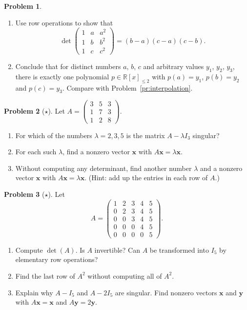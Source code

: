 \documentclass[11pt]{article}
\theoremstyle{definition}
\newtheorem{problem}{Problem}[section]
\begin{document}
\begin{problem}\label{pr:vandermonde}
    \begin{enumerate}[label=(\alph*)]
        \item Use row operations to show that
        \[\det \begin{pmatrix} 1 & a & a^2 \\ 1 & b & b^2 \\ 1 & c & c^2 \end{pmatrix} = (b - a)(c - a)(c - b).\]
        \item Conclude that for distinct numbers $a$, $b$, $c$ and arbitrary values $y_1$, $y_2$, $y_3$, there is exactly one polynomial $p \in \mathbb{R}[x]_{\leq 2}$ with $p(a) = y_1$, $p(b) = y_2$ and $p(c) = y_3$. Compare with Problem~\ref{pr:interpolation}.
    \end{enumerate}
\end{problem}

\begin{problem}[$\star$]\label{pr:lambda}
    Let $A = \begin{pmatrix} 3 & 5 & 3 \\ 1 & 7 & 3 \\ 1 & 2 & 8 \end{pmatrix}$.
    \begin{enumerate}[label=(\alph*)]
        \item For which of the numbers $\lambda = 2, 3, 5$ is the matrix $A - \lambda I_3$ singular?
        \item For each such $\lambda$, find a nonzero vector $\mathbf{x}$ with $A\mathbf{x} = \lambda \mathbf{x}$.
        \item Without computing any determinant, find another number $\lambda$ and a nonzero vector $\mathbf{x}$ with $A\mathbf{x} = \lambda \mathbf{x}$. (Hint: add up the entries in each row of $A$.)
    \end{enumerate}
\end{problem}

\begin{problem}[$\star$]\label{pr:upper5}
    Let
    \[A = \begin{pmatrix} 1 & 2 & 3 & 4 & 5 \\ 0 & 2 & 3 & 4 & 5 \\ 0 & 0 & 3 & 4 & 5 \\ 0 & 0 & 0 & 4 & 5 \\ 0 & 0 & 0 & 0 & 5 \end{pmatrix}.\]
    \begin{enumerate}[label=(\alph*)]
        \item Compute $\det(A)$. Is $A$ invertible? Can $A$ be transformed into $I_5$ by elementary row operations?
        \item Find the last row of $A^2$ without computing all of $A^2$.
        \item Explain why $A - I_5$ and $A - 2I_5$ are singular. Find nonzero vectors $\mathbf{x}$ and $\mathbf{y}$ with $A\mathbf{x} = \mathbf{x}$ and $A\mathbf{y} = 2\mathbf{y}$.
    \end{enumerate}
\end{problem}
\end{document}
